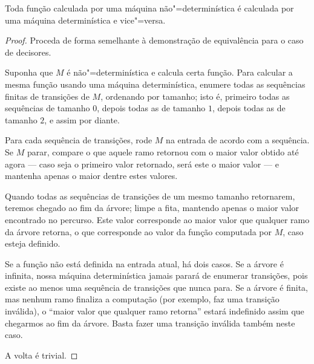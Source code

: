 \begin{theorem}
    Toda função calculada por uma máquina não"=determinística
    é calculada por uma máquina determinística
    e vice"=versa.
\end{theorem}
\begin{proof}
    Proceda de forma semelhante à demonstração de equivalência
    para o caso de decisores.

    Suponha que $M$ é não"=determinística e calcula certa função.
    Para calcular a mesma função usando uma máquina determinística,
    enumere todas as sequências finitas de transições de $M$,
    ordenando por tamanho;
    isto é,
    primeiro todas as sequências de tamanho $0$,
    depois todas as de tamanho $1$,
    depois todas as de tamanho $2$,
    e assim por diante.

    Para cada sequência de transições,
    rode $M$ na entrada de acordo com a sequência.
    Se $M$ parar,
    compare o que aquele ramo retornou
    com o maior valor obtido até agora
    --- caso seja o primeiro valor retornado,
    será este o maior valor
    --- e mantenha apenas o maior dentre estes valores.

    Quando todas as sequências de transições de um mesmo tamanho retornarem,
    teremos chegado ao fim da árvore;
    limpe a fita, mantendo apenas o maior valor encontrado no percurso.
    Este valor corresponde ao maior valor que qualquer ramo da árvore retorna,
    o que corresponde ao valor da função computada por $M$,
    caso esteja definido.

    Se a função não está definida na entrada atual,
    há dois casos.
    Se a árvore é infinita,
    nossa máquina determinística jamais parará de enumerar transições,
    pois existe ao menos uma sequência de transições que nunca para.
    Se a árvore é finita,
    mas nenhum ramo finaliza a computação
    (por exemplo, faz uma transição inválida),
    o ``maior valor que qualquer ramo retorna''
    estará indefinido assim que chegarmos ao fim da árvore.
    Basta fazer uma transição inválida também neste caso.

    A volta é trivial.
\end{proof}
